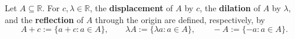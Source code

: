\begin{definition}
\label{def:displacement-dilation-reflection}
Let $A\subseteq\mathbb{R}$. For $c,\lambda\in\mathbb{R}$, the
\textbf{displacement} of $A$ by $c$, the \textbf{dilation} of $A$ by
$\lambda$, and the \textbf{reflection} of $A$ through the origin are
defined, respectively, by
\[
A+c:=\{a+c:a\in A\},
\qquad
\lambda A:=\{\lambda a:a\in A\},
\qquad
-A:=\{-a:a\in A\}.
\]
\end{definition}